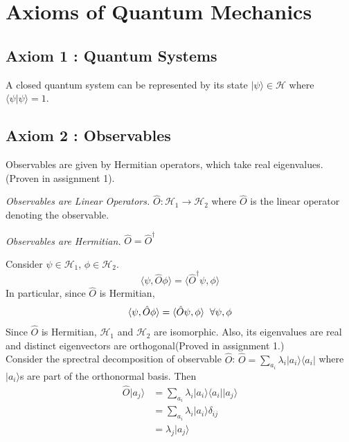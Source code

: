 \documentclass{article}
\begin{document}
\section{Axioms of Quantum Mechanics}

\subsection{Axiom 1 : Quantum Systems}
A closed quantum system can be represented by its state $| \psi \rangle \in \mathcal{H}$ where $\langle \psi | \psi \rangle = 1$.


\subsection{Axiom 2 : Observables}
Observables are given by Hermitian operators, which take real eigenvalues. (Proven in assignment 1).

\textit{Observables are Linear Operators.} $\hat{O} : \mathcal{H}_1 \rightarrow \mathcal{H}_2$ where $\hat{O}$ is the linear operator denoting the observable.

\textit{Observables are Hermitian.} $\hat{O} = \hat{O}^{\dagger}$

Consider $\psi \in \mathcal{H}_1$, $\phi \in \mathcal{H}_2$.
\begin{equation*}
	\langle \psi , \hat{O} \phi \rangle = \langle \hat{O}^{\dagger} \psi , \phi \rangle
\end{equation*}
In particular, since $\hat{O}$ is Hermitian,
\begin{align*}
	\langle \psi , \hat{O} \phi \rangle = \langle \hat{O} \psi , \phi \rangle \hspace{0.2cm} 
	\forall \psi, \phi                                                                       
\end{align*}
Since $\hat{O}$ is Hermitian, $\mathcal{H}_1$ and $\mathcal{H}_2$ are isomorphic. Also, its eigenvalues are real and distinct eigenvectors are orthogonal(Proved in assignment 1.)\\


Consider the sprectral decomposition of observable $\hat{O}$:
$
\hat{O} = \sum_{a_i} \lambda_i | a_i \rangle \langle a_i|
$
where $|a_i \rangle$s are part of the orthonormal basis. Then
\begin{align*}
	\hat{O}|a_j \rangle & = \sum_{a_i} \lambda_i |a_i \rangle \langle a_i | |a_j \rangle \\
	                    & =\sum_{a_i} \lambda_i |a_i \rangle \delta_{ij}                 \\
	                    & = \lambda_j |a_j \rangle                                       
\end{align*}
\end{document}
